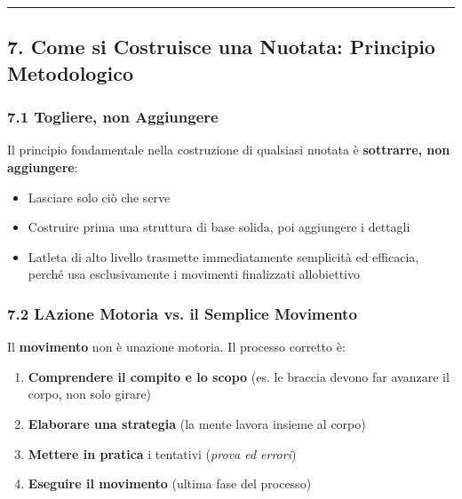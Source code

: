 \documentclass[a4paper,11pt]{article}
\providecommand{\tightlist}{%
  \setlength{\itemsep}{0pt}\setlength{\parskip}{0pt}}
\begin{document}
\begin{center}\rule{0.5\linewidth}{0.5pt}\end{center}

\subsection{7. Come si Costruisce una Nuotata: Principio
      Metodologico}\label{come-si-costruisce-una-nuotata-principio-metodologico}

\subsubsection{7.1 Togliere, non
      Aggiungere}\label{togliere-non-aggiungere}

Il principio fondamentale nella costruzione di qualsiasi nuotata è
\textbf{sottrarre, non aggiungere}:

\begin{itemize}
      \tightlist
      \item
            Lasciare solo ciò che serve
      \item
            Costruire prima una struttura di base solida, poi aggiungere i
            dettagli
      \item
            L\textquotesingle atleta di alto livello trasmette immediatamente
            semplicità ed efficacia, perché usa esclusivamente i movimenti
            finalizzati all\textquotesingle obiettivo
\end{itemize}

\subsubsection{7.2 L\textquotesingle Azione Motoria vs. il Semplice
      Movimento}\label{lazione-motoria-vs.-il-semplice-movimento}

Il \textbf{movimento} non è un\textquotesingle azione motoria. Il
processo corretto è:

\begin{enumerate}
      \tightlist
      \item
            \textbf{Comprendere il compito e lo scopo} (es. le braccia devono far
            avanzare il corpo, non solo girare)
      \item
            \textbf{Elaborare una strategia} (la mente lavora insieme al corpo)
      \item
            \textbf{Mettere in pratica} i tentativi (\emph{prova ed errori})
      \item
            \textbf{Eseguire il movimento} (ultima fase del processo)
\end{enumerate}
\end{document}
